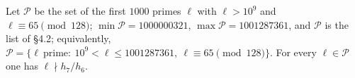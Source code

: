 Let $\mathcal P$ be the set of the first $1000$ primes $\ell$ with $\ell>10^9$ and $\ell\equiv65\pmod{128}$; $\min\mathcal P=1000000321$, $\max\mathcal P=1001287361$, and $\mathcal P$ is the list of \cite{KY} \S4.2; equivalently, $\mathcal P=\{\ell\ \text{prime}:\ 10^9<\ell\le1001287361,\ \ell\equiv65\pmod{128}\}$. For every $\ell\in\mathcal P$ one has $\ell\nmid h_7/h_6$.
